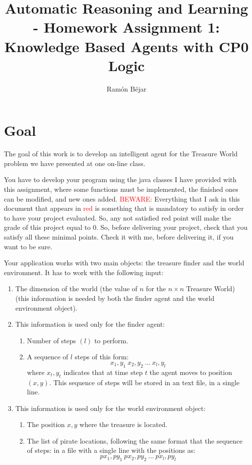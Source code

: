 \documentclass{tufte-handout}
\title[HW 1: Knowledge Based Agents]{Automatic Reasoning and Learning \\-
Homework Assignment 1: Knowledge Based Agents with  CP0 Logic}
\author[ramon]{Ram\'on B\'ejar}
\begin{document}
\maketitle

\section{Goal}

\begin{fullwidth}
The goal of this work is to develop an intelligent agent for
the Treasure World problem we have presented at one on-line class.

You have to develop your program using the java classes I have provided
with this assignment, where some functions must be implemented, the
finished ones can be modified, and new ones added.
\textcolor{red}{BEWARE:} Everything that I ask in this document that appears in
\textcolor{red}{red} is something that is mandatory to satisfy in order to have
your project evaluated. So, any not satisfied  red point will make the grade of this
project equal to 0. So, before delivering your project, check that you satisfy all these
minimal points. Check it with me, before delivering it, if you want to be sure.

Your application works with two main objects: the treasure finder and the world environment. It has to work with the following input:
\begin{enumerate}
\item The dimension of the world (the value of $n$ for the
$n\times n$ Treasure World) (this information is needed by both
the finder agent and the world environment object).
\item This information is used only for the finder agent:
\begin{enumerate}
\item Number of steps $(l)$ to perform.
\item A sequence of $l$ steps of this form:
$$
 x_1,y_1 \ x_2,y_2 \ ... \ x_l,y_l
$$
where $ x_t,y_t $ indicates that at time step $t$ the agent moves
 to position $(x,y)$.
This sequence of steps will be stored in an text file, in a single line.
\end{enumerate}
\item This information is used only for the  world environment object:
\begin{enumerate}
\item The position $x,y$ where the treasure is located.
\item The list of pirate locations, following the same format that the sequence
of steps: in a file with a single line with the positions as:
$$
 px_1,py_1 \ px_2,py_2 \ ... \ px_l,py_l
$$
\end{enumerate}
\end{enumerate}



\end{fullwidth}
\end{document}
